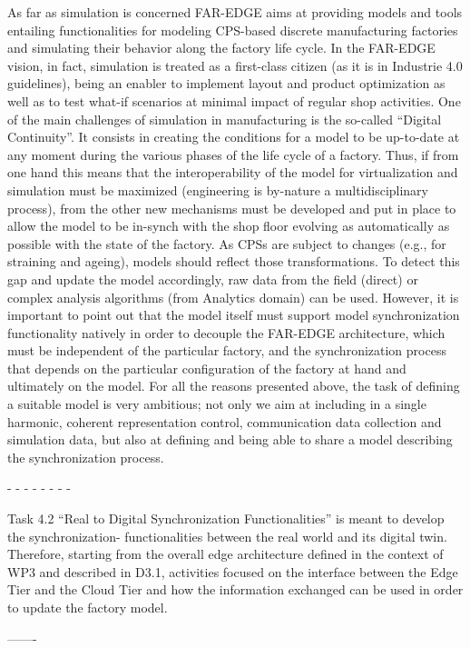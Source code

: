 As far as simulation is concerned FAR-EDGE aims at providing models and tools entailing functionalities for modeling CPS-based discrete manufacturing factories and simulating their behavior along the factory life cycle. 
In the FAR-EDGE vision, in fact, simulation is treated as a first-class citizen (as it is in Industrie 4.0 guidelines), being an enabler to implement layout and product optimization as well as to test what-if scenarios at minimal impact of regular shop activities. 
One of the main challenges of simulation in manufacturing is the so-called “Digital Continuity”. It consists in creating the conditions for a model to be up-to-date at any moment during the various phases of the life cycle of a factory. Thus, if from one hand this means that the interoperability of the model for virtualization and simulation must be maximized (engineering is by-nature a multidisciplinary process), from the other new mechanisms must be developed and put in place to allow the model to be in-synch with the shop floor evolving as automatically as possible with the state of the factory. As CPSs are subject to changes (e.g., for straining and ageing), models should reflect those transformations. To detect this gap and update the model accordingly, raw data from the field (direct) or complex analysis algorithms (from Analytics domain) can be used. However, it is important to point out that the model itself must support model synchronization functionality natively in order to decouple the FAR-EDGE architecture, which must be independent of the particular factory, and the synchronization process that depends on the particular configuration of the factory at hand and ultimately on the model. 
For all the reasons presented above, the task of defining a suitable model is very ambitious; not only we aim at including in a single harmonic, coherent representation control, communication data collection and simulation data, but also at defining and being able to share a model describing the synchronization process.


- - - - - - - -

Task 4.2 “Real to Digital Synchronization Functionalities” is meant to develop the synchronization- functionalities between the real world and its digital twin. Therefore, starting from the overall edge architecture defined in the context of WP3 and described in D3.1, activities focused on the interface between the Edge Tier and the Cloud Tier and how the information exchanged can be used in order to update the factory model.

------- 


